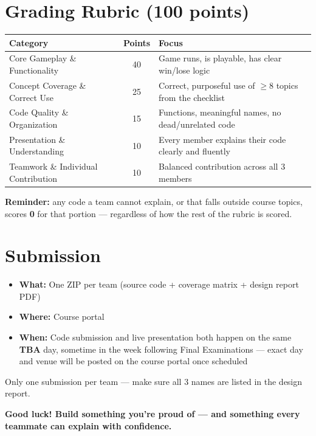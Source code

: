 \documentclass[11pt]{article}
\begin{document}
\section*{Grading Rubric (100 points)}

\begin{center}
\begin{tabular}{@{}lcp{6.7cm}@{}}
\toprule
Category & Points & Focus \\
\midrule
Core Gameplay \& Functionality & 40 & Game runs, is playable, has clear win/lose logic \\
Concept Coverage \& Correct Use & 25 & Correct, purposeful use of $\geq$8 topics from the checklist \\
Code Quality \& Organization & 15 & Functions, meaningful names, no dead/unrelated code \\
Presentation \& Understanding & 10 & Every member explains their code clearly and fluently \\
Teamwork \& Individual Contribution & 10 & Balanced contribution across all 3 members \\
\bottomrule
\end{tabular}
\end{center}

\textbf{Reminder:} any code a team cannot explain, or that falls outside course topics, scores
\textbf{0} for that portion --- regardless of how the rest of the rubric is scored.

\section*{Submission}

\begin{itemize}[leftmargin=*,nosep]
  \item \textbf{What:} One ZIP per team (source code + coverage matrix + design report PDF)
  \item \textbf{Where:} Course portal
  \item \textbf{When:} Code submission and live presentation both happen on the same \textbf{TBA}
        day, sometime in the week following Final Examinations --- exact day and venue will be
        posted on the course portal once scheduled
\end{itemize}

Only one submission per team --- make sure all 3 names are listed in the design report.

\bigskip
\centerline{\textbf{Good luck! Build something you're proud of --- and something every teammate can explain with confidence.}}
\end{document}
